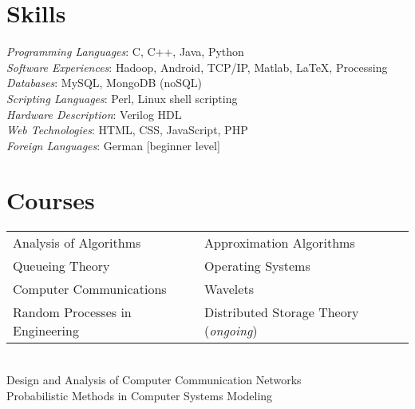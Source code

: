 \documentclass[margin,line]{resume}
\begin{document}
\begin{resume}
    
    \section{\mysidestyle Skills} 

    \textsl{Programming Languages}: C, C++, Java, Python\\
    \textsl{Software Experiences}: Hadoop, Android, TCP/IP, Matlab, \LaTeX, Processing\\
    \textsl{Databases}: MySQL, MongoDB (noSQL)\\
    \textsl{Scripting Languages}: Perl, Linux shell scripting \\
    \textsl{Hardware Description}: Verilog HDL \\
    \textsl{Web Technologies}: HTML, CSS, JavaScript, PHP \\
    \textsl{Foreign Languages}: German [beginner level]


\section{\mysidestyle Courses} 


\begin{tabular}{@{}p{7cm}p{7cm}}
Analysis of Algorithms       &  Approximation Algorithms                   \\
Queueing Theory  & Operating Systems \\
Computer Communications & Wavelets \\
Random Processes in Engineering  & Distributed Storage Theory (\emph{ongoing})
\end{tabular} \\
Design and Analysis of Computer Communication Networks \\
Probabilistic Methods in Computer Systems Modeling    \\




\end{resume}
\end{document}
